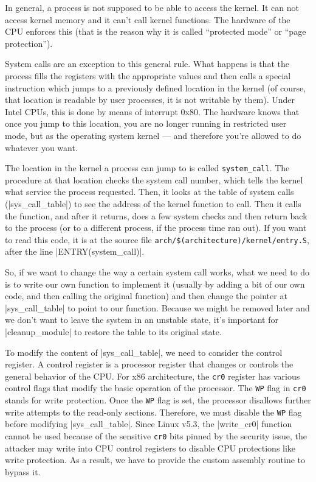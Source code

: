 \documentclass[10pt, oneside]{book}
\begin{document}
In general, a process is not supposed to be able to access the kernel.
It can not access kernel memory and it can't call kernel functions.
The hardware of the CPU enforces this (that is the reason why it is called ``protected mode'' or ``page protection'').

System calls are an exception to this general rule.
What happens is that the process fills the registers with the appropriate values and then calls a special instruction which jumps to a previously defined location in the kernel (of course, that location is readable by user processes, it is not writable by them).
Under Intel CPUs, this is done by means of interrupt 0x80. The hardware knows that once you jump to this location, you are no longer running in restricted user mode, but as the operating system kernel --- and therefore you're allowed to do whatever you want.

The location in the kernel a process can jump to is called \verb|system_call|.
The procedure at that location checks the system call number, which tells the kernel what service the process requested.
Then, it looks at the table of system calls (\cpp|sys_call_table|) to see the address of the kernel function to call.
Then it calls the function, and after it returns, does a few system checks and then return back to the process (or to a different process, if the process time ran out).
If you want to read this code, it is at the source file \verb|arch/$(architecture)/kernel/entry.S|, after the line \cpp|ENTRY(system_call)|.

So, if we want to change the way a certain system call works, what we need to do is to write our own function to implement it (usually by adding a bit of our own code, and then calling the original function) and then change the pointer at \cpp|sys_call_table| to point to our function.
Because we might be removed later and we don't want to leave the system in an unstable state, it's important for \cpp|cleanup_module| to restore the table to its original state.

To modify the content of \cpp|sys_call_table|, we need to consider the control register.
A control register is a processor register that changes or controls the general behavior of the CPU.
For x86 architecture, the \verb|cr0| register has various control flags that modify the basic operation of the processor.
The \verb|WP| flag in \verb|cr0| stands for write protection.
Once the \verb|WP| flag is set, the processor disallows further write attempts to the read-only sections.
Therefore, we must disable the \verb|WP| flag before modifying \cpp|sys_call_table|.
Since Linux v5.3, the \cpp|write_cr0| function cannot be used because of the sensitive \verb|cr0| bits pinned by the security issue, the attacker may write into CPU control registers to disable CPU protections like write protection.
As a result, we have to provide the custom assembly routine to bypass it.
\end{document}
